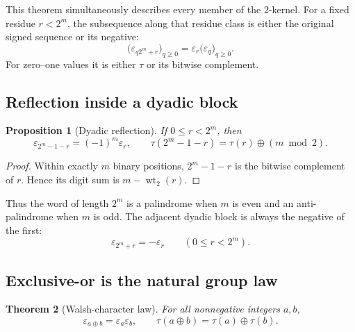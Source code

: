 \documentclass[11pt,oneside]{article}
\newtheorem{theorem}{Theorem}[section]
\newtheorem{proposition}[theorem]{Proposition}
\theoremstyle{definition}
\theoremstyle{remark}
\newcommand{\wt}{\operatorname{wt}_2}
\newcommand{\xor}{\mathbin{\oplus}}
\begin{document}
This theorem simultaneously describes every member of the \(2\)-kernel.  For
a fixed residue \(r<2^m\), the subsequence along that residue class is either
the original signed sequence or its negative:
\begin{equation}
 \bigl(\varepsilon_{q2^m+r}\bigr)_{q\ge0}
 =\varepsilon_r\bigl(\varepsilon_q\bigr)_{q\ge0}.
 \label{eq:kernel-residue}
\end{equation}
For zero--one values it is either \(\tau\) or its bitwise complement.

\subsection{Reflection inside a dyadic block}

\begin{proposition}[Dyadic reflection]
\label{prop:dyadic-reflection}
If \(0\le r<2^m\), then
\begin{equation}
 \varepsilon_{2^m-1-r}=(-1)^m\varepsilon_r,
 \qquad
 \tau(2^m-1-r)=\tau(r)\xor(m\bmod2).
 \label{eq:dyadic-reflection}
\end{equation}
\end{proposition}

\begin{proof}
Within exactly \(m\) binary positions, \(2^m-1-r\) is the bitwise complement
of \(r\).  Hence its digit sum is \(m-\wt(r)\).
\end{proof}

Thus the word of length \(2^m\) is a palindrome when \(m\) is even and an
anti-palindrome when \(m\) is odd.  The adjacent dyadic block is always the
negative of the first:
\begin{equation}
 \varepsilon_{2^m+r}=-\varepsilon_r
 \qquad(0\le r<2^m).
 \label{eq:next-block-negative}
\end{equation}

\subsection{Exclusive-or is the natural group law}

\begin{theorem}[Walsh-character law]
\label{thm:xor-law}
For all nonnegative integers \(a,b\),
\begin{equation}
 \varepsilon_{a\xor b}=\varepsilon_a\varepsilon_b,
 \qquad
 \tau(a\xor b)=\tau(a)\xor\tau(b).
 \label{eq:xor-law}
\end{equation}
\end{theorem}
\end{document}
